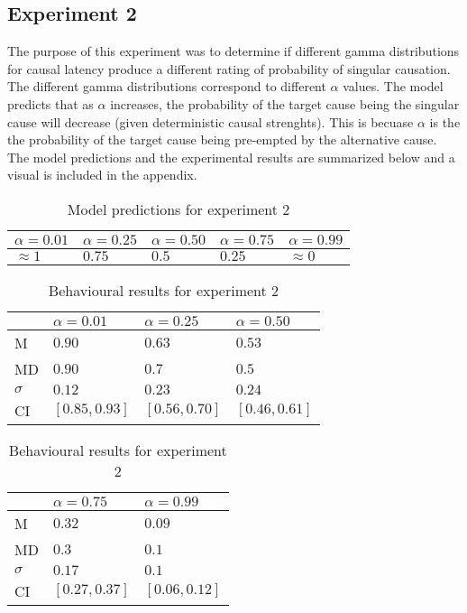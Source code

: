 \documentclass[10pt,letterpaper]{article}
\begin{document}
\subsection{Experiment 2}
The purpose of this experiment was to determine if different gamma distributions for causal latency produce a different rating of probability of singular causation. The different gamma distributions correspond to different $\alpha$ values. The model predicts that as $\alpha$
increases, the probability of the target cause being the singular cause will decrease (given deterministic causal strenghts). This is
becuase $\alpha$ is the the probability of the target cause being pre-empted by the alternative cause. The model predictions and 
the experimental results are summarized below and a visual is included in the appendix.
\begin{table}[H]
\begin{center} 
\caption{Model predictions for experiment 2} 
\label{model preds} 
\vskip 0.12in
\begin{tabular}{lllll} 
\toprule
$\alpha = 0.01$ &  $\alpha = 0.25$ & $\alpha = 0.50$ & $\alpha = 0.75$ & $\alpha = 0.99$\\
\midrule
	$\approx 1$ & $0.75$ & $0.5$ & $0.25$ & $\approx 0$ \\
\bottomrule
\end{tabular} 
\end{center} 
\end{table}
\begin{table}[H]
\begin{center} 
\caption{Behavioural results for experiment 2} 
\label{model preds} 
\vskip 0.12in
\begin{tabular}{llll} 
\toprule
& $\alpha = 0.01$ &  $\alpha = 0.25$ & $\alpha = 0.50$ \\
\midrule
	M & $0.90$ & $0.63$ & $0.53$ \\
	MD & $0.90$ & $0.7$ & $0.5$ \\
	$\sigma$ & $0.12$ & $0.23$ & $0.24$ \\
	CI & $[0.85, 0.93]$ & $[0.56, 0.70]$ & $[0.46, 0.61]$ \\
\bottomrule
\end{tabular} 
\begin{tabular}{lll} 
& $\alpha = 0.75$ & $\alpha = 0.99$\\
\midrule
	M &  $0.32$ & $0.09$ \\
	MD &  $0.3$ & $0.1$ \\
	$\sigma$ & $0.17$ & $0.1$ \\
	CI & $[0.27, 0.37]$ & $[0.06, 0.12]$\\
\bottomrule
\end{tabular}
\end{center} 
\end{table}
\end{document}
